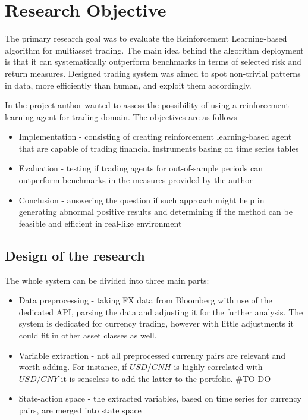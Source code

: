 \documentclass[]{article}
\providecommand{\tightlist}{%
  \setlength{\itemsep}{0pt}\setlength{\parskip}{0pt}}
\begin{document}
\section{Research Objective}\label{research-objective}

The primary research goal was to evaluate the Reinforcement
Learning-based algorithm for multiasset trading. The main idea behind
the algorithm deployment is that it can systematically outperform
benchmarks in terms of selected risk and return measures. Designed
trading system was aimed to spot non-trivial patterns in data, more
efficiently than human, and exploit them accordingly.

In the project author wanted to assess the possibility of using a
reinforcement learning agent for trading domain. The objectives are as
follows

\begin{itemize}
\tightlist
\item
  Implementation - consisting of creating reinforcement learning-based
  agent that are capable of trading financial instruments basing on time
  series tables
\item
  Evaluation - testing if trading agents for out-of-sample periods can
  outperform benchmarks in the measures provided by the author
\item
  Conclusion - answering the question if such approach might help in
  generating abnormal positive results and determining if the method can
  be feasible and efficient in real-like environment
\end{itemize}

\subsection{Design of the research}\label{design-of-the-research}

The whole system can be divided into three main parts:

\begin{itemize}
\tightlist
\item
  Data preprocessing - taking FX data from Bloomberg with use of the
  dedicated API, parsing the data and adjusting it for the further
  analysis. The system is dedicated for currency trading, however with
  little adjustments it could fit in other asset classes as well.
\item
  Variable extraction - not all preprocessed currency pairs are relevant
  and worth adding. For instance, if \(USD/CNH\) is highly correlated
  with \(USD/CNY\) it is senseless to add the latter to the portfolio.
  \#TO DO
\item
  State-action space - the extracted variables, based on time series for
  currency pairs, are merged into state space
\end{itemize}
\end{document}
